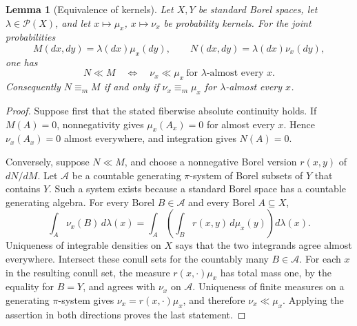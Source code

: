 \documentclass[11pt]{article}
\numberwithin{equation}{section}
\newtheorem{lemma}[theorem]{Lemma}
\theoremstyle{definition}
\newcommand{\Prob}{\mathcal P}
\newcommand{\ME}{\mathrel{\equiv_m}}
\begin{document}
\begin{lemma}[Equivalence of kernels]\label{lem:fibers}
Let $X,Y$ be standard Borel spaces, let $\lambda\in\Prob(X)$, and let
$x\mapsto\mu_x$, $x\mapsto\nu_x$ be probability kernels. For the joint
probabilities
\[
 M(dx,dy)=\lambda(dx)\mu_x(dy),\qquad
 N(dx,dy)=\lambda(dx)\nu_x(dy),
\]
one has
\[
 N\ll M\quad\Longleftrightarrow\quad
 \nu_x\ll\mu_x\ \text{for $\lambda$-almost every $x$}.
\]
Consequently $N\ME M$ if and only if
$\nu_x\ME\mu_x$ for $\lambda$-almost every $x$.
\end{lemma}
\begin{proof}
Suppose first that the stated fiberwise absolute continuity holds. If
$M(A)=0$, nonnegativity gives $\mu_x(A_x)=0$ for almost every $x$.
Hence $\nu_x(A_x)=0$ almost everywhere, and integration gives $N(A)=0$.

Conversely, suppose $N\ll M$, and choose a nonnegative Borel version
$r(x,y)$ of $dN/dM$. Let $\mathcal A$ be a countable generating
$\pi$-system of Borel subsets of $Y$ that contains $Y$. Such a system
exists because a standard Borel space has a countable generating algebra.
For every Borel $B\in\mathcal A$ and every Borel $A\subseteq X$,
\[
 \int_A\nu_x(B)\,d\lambda(x)
 =\int_A\left(\int_B r(x,y)\,d\mu_x(y)\right)d\lambda(x).
\]
Uniqueness of integrable densities on $X$ says that the two integrands
agree almost everywhere. Intersect these conull sets for the countably
many $B\in\mathcal A$. For each $x$ in the resulting conull set,
the measure $r(x,\cdot)\mu_x$ has total mass one, by the equality for
$B=Y$, and agrees with $\nu_x$ on $\mathcal A$. Uniqueness of finite
measures on a generating $\pi$-system gives
$\nu_x=r(x,\cdot)\mu_x$, and therefore $\nu_x\ll\mu_x$.
Applying the assertion in both directions proves the last statement.
\end{proof}
\end{document}
